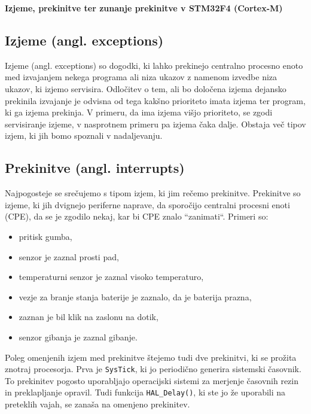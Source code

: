 \documentclass[12pt,letterpaper]{article}
\begin{document}
\begin{center}
    \textbf{\Large Izjeme, prekinitve ter zunanje prekinitve v STM32F4 (Cortex-M)}   
\end{center}

\subsection*{Izjeme (angl. exceptions)}

Izjeme (angl. exceptions) so dogodki, ki lahko prekinejo centralno procesno enoto med izvajanjem nekega programa ali niza ukazov z namenom izvedbe niza ukazov, ki izjemo servisira. Odločitev o tem, ali bo določena izjema dejansko prekinila izvajanje je odvisna od tega kakšno prioriteto imata izjema ter program, ki ga izjema prekinja. V primeru, da ima izjema višjo prioriteto, se zgodi servisiranje izjeme, v nasprotnem primeru pa izjema čaka dalje. Obstaja več tipov izjem, ki jih bomo spoznali v nadaljevanju. 

\subsection*{Prekinitve (angl. interrupts)}

Najpogosteje se srečujemo s tipom izjem, ki jim rečemo prekinitve. Prekinitve so izjeme, ki jih dvignejo periferne naprave, da sporočijo centralni procesni enoti (CPE), da se je zgodilo nekaj, kar bi CPE znalo ``zanimati``. Primeri so:

\begin{itemize}
    \item pritisk gumba,
    \item senzor je zaznal prosti pad,
    \item temperaturni senzor je zaznal visoko temperaturo,
    \item vezje za branje stanja baterije je zaznalo, da je baterija prazna,
    \item zaznan je bil klik na zaslonu na dotik,
    \item senzor gibanja je zaznal gibanje.
\end{itemize}

Poleg omenjenih izjem med prekinitve štejemo tudi dve prekinitvi, ki se prožita znotraj procesorja. Prva je \texttt{SysTick}, ki jo periodično generira sistemski časovnik. To prekinitev pogosto uporabljajo operacijski sistemi za merjenje časovnih rezin in preklapljanje opravil. Tudi funkcija \texttt{HAL\_Delay()}, ki ste jo že uporabili na preteklih vajah, se zanaša na omenjeno prekinitev.
\end{document}
